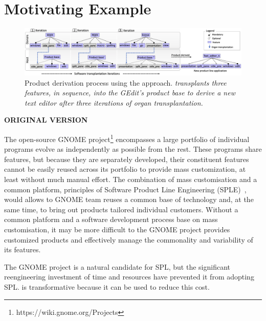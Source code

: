 \section{Motivating Example} \label{sec:motivating_example}

 \begin{figure}[t]
    \centering \includegraphics[width=\textwidth]{images/incremental_ST4.png}
    \caption{Product derivation process using the \FOUNDRY approach. \textit{\prodscalpel transplants three features, in sequence, into the GEdit's product base to derive a new text editor after three iterations of organ transplantation.} }
    \label{fig:incremental_pd}
\end{figure} 

\textbf{ORIGINAL VERSION}

The open-source GNOME project\footnote{https://wiki.gnome.org/Projects} encompasses a large portfolio of individual programs evolve as independently as possible from the rest. These programs share features, but because they are separately developed, their constituent features cannot be easily reused across its portfolio to provide mass customization, at least without much manual effort. The combination of mass customisation and a common platform, principles of Software Product Line Engineering (SPLE)~\cite{Pohl2005}, would allows to GNOME team reuses a common base of technology and, at the same time, to bring out products tailored individual customers. Without a common platform and a software development process base on mass customisation, it may be more difficult to the GNOME project provides customized products and effectively manage the commonality and variability of its features.

The GNOME  project is a natural candidate for SPL, but the significant reengineering investment of time and resources have prevented it from adopting SPL. \FOUNDRY is transformative because it can be used to reduce this cost. 

